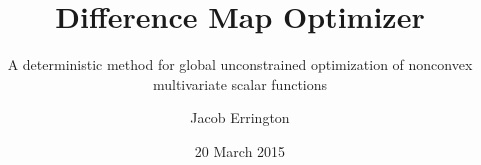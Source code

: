 \documentclass{beamer}
\title[DM Optimizer]{Difference Map Optimizer}
\subtitle{A deterministic method for global unconstrained optimization of
    nonconvex multivariate scalar functions}
\author{Jacob Errington}
\date{20 March 2015}
\begin{document}
\frame{\titlepage}
\end{document}
